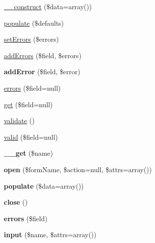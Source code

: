 \begin{DoxyCompactItemize}
\item 
\hyperlink{classForm_a918137d720fb6740e8d91b5355023e3e}{\_\-\_\-construct} (\$data=array())
\item 
\hyperlink{classForm_a5c9e86fcf411e32394ef3ccf9be785ae}{populate} (\$defaults)
\item 
\hyperlink{classForm_a4146c9fec58751931eeeafb6a5032109}{setErrors} (\$errors)
\item 
\hyperlink{classForm_ad628bf69f4aacf56874e228f4dffe278}{addErrors} (\$field, \$errors)
\item 
\hypertarget{classForm_a76a626645b5dd91fea35238c40b73057}{
{\bfseries addError} (\$field, \$error)}
\label{classForm_a76a626645b5dd91fea35238c40b73057}

\item 
\hyperlink{classForm_a1cd7191ba1fab1817ea6bffab804f82d}{errors} (\$field=null)
\item 
\hyperlink{classForm_a30692b7cf24078d8ce209b98fd27aa80}{get} (\$field=null)
\item 
\hyperlink{classForm_a89ce95b4a8eacc465730fb5e240ff66d}{validate} ()
\item 
\hyperlink{classForm_a719fa0e86b18283faee39d7e0d69957d}{valid} (\$field=null)
\item 
\hypertarget{classForm_a29e82a4cae1e8a22abad773b8c2b2b02}{
{\bfseries \_\-\_\-get} (\$name)}
\label{classForm_a29e82a4cae1e8a22abad773b8c2b2b02}

\item 
\hypertarget{classForm_a51c103095318a61cc45b2c7b9c84a8ee}{
{\bfseries open} (\$formName, \$action=null, \$attrs=array())}
\label{classForm_a51c103095318a61cc45b2c7b9c84a8ee}

\item 
\hypertarget{classForm_a98e8003caf23915207cdf5efd94fae2a}{
{\bfseries populate} (\$data=array())}
\label{classForm_a98e8003caf23915207cdf5efd94fae2a}

\item 
\hypertarget{classForm_aaa8d1ff2d98b23893bfa66ae8766212a}{
{\bfseries close} ()}
\label{classForm_aaa8d1ff2d98b23893bfa66ae8766212a}

\item 
\hypertarget{classForm_a926ffa6cfcb6b0df448fdb3d084f3a85}{
{\bfseries errors} (\$field)}
\label{classForm_a926ffa6cfcb6b0df448fdb3d084f3a85}

\item 
\hypertarget{classForm_ad346f6535dce3b737a354ec158fc56b8}{
{\bfseries input} (\$name, \$attrs=array())}
\label{classForm_ad346f6535dce3b737a354ec158fc56b8}


\end{DoxyCompactItemize}
